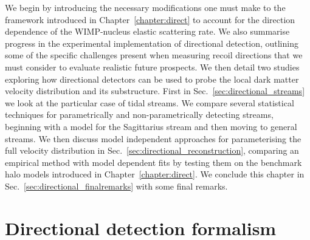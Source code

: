 We begin by introducing the necessary modifications one must make to the framework introduced in Chapter~\ref{chapter:direct} to account for the direction dependence of the WIMP-nucleus elastic scattering rate. We also summarise progress in the experimental implementation of directional detection, outlining some of the specific challenges present when measuring recoil directions that we must consider to evaluate realistic future prospects. We then detail two studies exploring how directional detectors can be used to probe the local dark matter velocity distribution and its substructure. First in Sec.~\ref{sec:directional_streams} we look at the particular case of tidal streams. We compare several statistical techniques for parametrically and non-parametrically detecting streams, beginning with a model for the Sagittarius stream and then moving to general streams. We then discuss model independent approaches for parameterising the full velocity distribution in Sec.~\ref{sec:directional_reconstruction}, comparing an empirical method with model dependent fits by testing them on the benchmark halo models introduced in Chapter~\ref{chapter:direct}. We conclude this chapter in Sec.~\ref{sec:directional_finalremarks} with some final remarks.

\section{Directional detection formalism}
